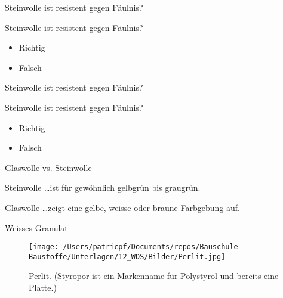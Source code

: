 \begin{frame}{Steinwolle ist resistent gegen Fäulnis?}
    \begin{Fragenblock}
        Steinwolle ist resistent gegen Fäulnis?
        
        \begin{itemize}
            \item[\faSquare] Richtig
            \item[\faSquare] Falsch
        \end{itemize}
    \end{Fragenblock}
\end{frame}

\begin{frame}{Steinwolle ist resistent gegen Fäulnis?}
    \begin{Fragenblock}
        Steinwolle ist resistent gegen Fäulnis?
        
        \begin{itemize}
			\item[\textcolor{green!70!black}{\faCheckSquare}] Richtig
			\item[\faSquare] Falsch
        \end{itemize}
    \end{Fragenblock}
\end{frame}


\begin{frame}{Glaswolle vs. Steinwolle}

	\begin{block}{Steinwolle}
		\ldots ist für gewöhnlich gelbgrün bis graugrün.
	\end{block}
	\pause
	\begin{block}{Glaswolle}
		\ldots zeigt eine gelbe, weisse oder braune Farbgebung auf.
	\end{block}
\end{frame}

\begin{frame}{Weisses Granulat}

    \begin{figure}[H]
        \centering
        \texttt{[image: /Users/patricpf/Documents/repos/Bauschule-Baustoffe/Unterlagen/12\_WDS/Bilder/Perlit.jpg]}
        \caption{Perlit. (Styropor ist ein Markenname für Polystyrol und bereits eine Platte.)}
    \end{figure}


\end{frame}


